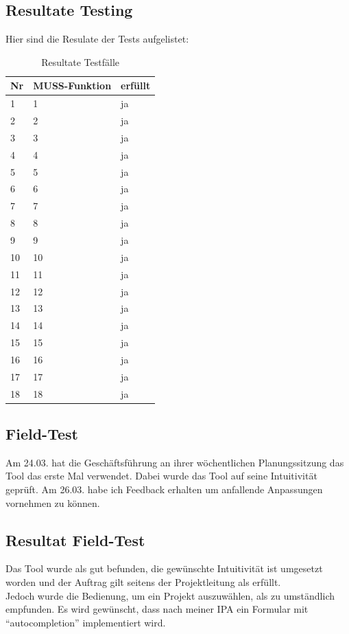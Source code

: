 \subsection{Resultate Testing}
Hier sind die Resulate der Tests aufgelistet:
\begin{table}[!ht]
\begin{center}
    \begin{tabular}{lll}
        \toprule Nr & MUSS-Funktion & erfüllt \\
        \midrule 1 & 1 & ja\\
        \midrule 2 & 2 & ja\\
        \midrule 3 & 3 & ja\\
        \midrule 4 & 4 & ja\\
        \midrule 5 & 5 & ja\\
        \midrule 6 & 6 & ja\\
        \midrule 7 & 7 & ja\\
        \midrule 8 & 8 & ja\\
        \midrule 9 & 9 & ja\\
        \midrule 10 & 10 & ja\\
        \midrule 11 & 11 & ja\\
        \midrule 12 & 12 & ja\\
        \midrule 13 & 13 & ja\\
        \midrule 14 & 14 & ja\\
        \midrule 15 & 15 & ja\\
        \midrule 16 & 16 & ja\\
        \midrule 17 & 17 & ja\\
        \midrule 18 & 18 & ja\\
        \bottomrule
    \end{tabular}
    \caption{Resultate Testfälle}
    \label{tab:testing_muss_funktionen_ziele}
\end{center}
\end{table}
\subsection{Field-Test}
Am 24.03. hat die Geschäftsführung an ihrer wöchentlichen Planungssitzung das Tool das erste Mal verwendet.
Dabei wurde das Tool auf seine Intuitivität geprüft. Am 26.03. habe ich Feedback erhalten um anfallende Anpassungen vornehmen zu können.
\subsection{Resultat Field-Test}
Das Tool wurde als gut befunden, die gewünschte Intuitivität ist umgesetzt worden und der Auftrag gilt seitens der Projektleitung als erfüllt.\\
Jedoch wurde die Bedienung, um ein Projekt auszuwählen, als zu umständlich empfunden. Es wird gewünscht, dass nach meiner IPA ein Formular mit ``autocompletion'' implementiert wird.
